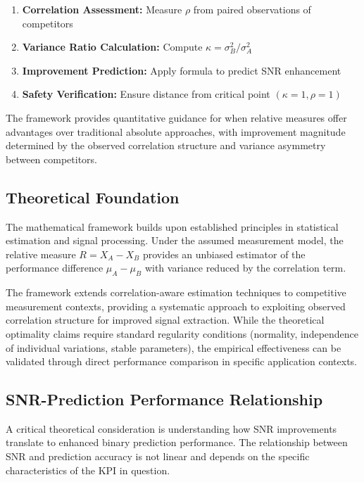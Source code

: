 \begin{enumerate}
    \item \textbf{Correlation Assessment:} Measure $\rho$ from paired observations of competitors
    \item \textbf{Variance Ratio Calculation:} Compute $\kappa = \sigma_B^2/\sigma_A^2$
    \item \textbf{Improvement Prediction:} Apply formula to predict SNR enhancement
    \item \textbf{Safety Verification:} Ensure distance from critical point $(\kappa=1, \rho=1)$
\end{enumerate}

The framework provides quantitative guidance for when relative measures offer advantages over traditional absolute approaches, with improvement magnitude determined by the observed correlation structure and variance asymmetry between competitors.

\subsection{Theoretical Foundation}

The mathematical framework builds upon established principles in statistical estimation and signal processing. Under the assumed measurement model, the relative measure $R = X_A - X_B$ provides an unbiased estimator of the performance difference $\mu_A - \mu_B$ with variance reduced by the correlation term.

The framework extends correlation-aware estimation techniques to competitive measurement contexts, providing a systematic approach to exploiting observed correlation structure for improved signal extraction. While the theoretical optimality claims require standard regularity conditions (normality, independence of individual variations, stable parameters), the empirical effectiveness can be validated through direct performance comparison in specific application contexts.

\subsection{SNR-Prediction Performance Relationship}

A critical theoretical consideration is understanding how SNR improvements translate to enhanced binary prediction performance. The relationship between SNR and prediction accuracy is not linear and depends on the specific characteristics of the KPI in question.


